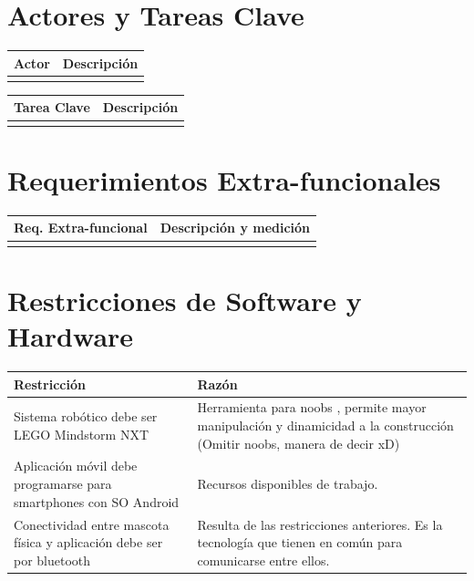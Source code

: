 \documentclass[letterpaper,12pt]{article} %
\numberwithin{equation}{section} %
\numberwithin{figure}{section} %
\numberwithin{table}{section} %
\begin{document}
\newpage
\section{Actores y Tareas Clave}

\begin{table}[hb!]
  \begin{tabular}{lp{7cm}}\hline
    Actor & Descripci\'on \\ \hline \hline %
    & \\ \hline    
  \end{tabular}
\end{table}

\begin{table}[hb!]
  \begin{tabular}{lp{7cm}}\hline
    Tarea Clave & Descripci\'on \\ \hline\hline %
    & \\ \hline
  \end{tabular}
\end{table}

\newpage
\section{Requerimientos Extra-funcionales}

\begin{table}[hb!]
  \begin{tabular}{lp{7cm}}\hline 
    Req. Extra-funcional & Descripci\'on y medici\'on \\ \hline\hline %
    & \\ \hline
  \end{tabular}
\end{table}

\newpage
\section{Restricciones de Software y Hardware}

\begin{table}[hb!]
  \begin{tabular}{lp{7cm}}\hline
    Restricci\'on & Raz\'on \\ \hline\hline %
    Sistema rob\'otico debe ser LEGO Mindstorm NXT & Herramienta para noobs , permite mayor manipulación y dinamicidad a la construcción (Omitir noobs, manera de decir xD)\\ \hline
	Aplicaci\'on m\'ovil debe programarse para smartphones con SO Android & Recursos disponibles de trabajo. \\ \hline
	Conectividad entre mascota f\'isica y aplicaci\'on debe ser por bluetooth & Resulta de las restricciones anteriores. Es la tecnología que tienen en común para comunicarse entre ellos.\\ \hline \hline
  \end{tabular}
\end{table}
\end{document}
